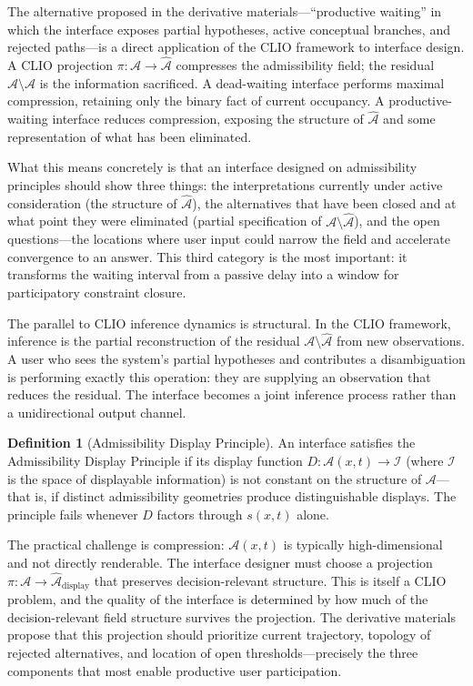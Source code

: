 \documentclass[12pt, a4paper]{article}
\theoremstyle{definition}
\newtheorem{defn}{Definition}[section]
\begin{document}
The alternative proposed in the derivative materials---``productive waiting'' in which the interface exposes partial hypotheses, active conceptual branches, and rejected paths---is a direct application of the CLIO framework to interface design. A CLIO projection $\pi : \mathcal{A} \to \hat{\mathcal{A}}$ compresses the admissibility field; the residual $\mathcal{A} \setminus \hat{\mathcal{A}}$ is the information sacrificed. A dead-waiting interface performs maximal compression, retaining only the binary fact of current occupancy. A productive-waiting interface reduces compression, exposing the structure of $\hat{\mathcal{A}}$ and some representation of what has been eliminated.

What this means concretely is that an interface designed on admissibility principles should show three things: the interpretations currently under active consideration (the structure of $\hat{\mathcal{A}}$), the alternatives that have been closed and at what point they were eliminated (partial specification of $\mathcal{A} \setminus \hat{\mathcal{A}}$), and the open questions---the locations where user input could narrow the field and accelerate convergence to an answer. This third category is the most important: it transforms the waiting interval from a passive delay into a window for participatory constraint closure.

The parallel to CLIO inference dynamics is structural. In the CLIO framework, inference is the partial reconstruction of the residual $\mathcal{A} \setminus \hat{\mathcal{A}}$ from new observations. A user who sees the system's partial hypotheses and contributes a disambiguation is performing exactly this operation: they are supplying an observation that reduces the residual. The interface becomes a joint inference process rather than a unidirectional output channel.

\begin{defn}[Admissibility Display Principle]
An interface satisfies the Admissibility Display Principle if its display function $D : \mathcal{A}(x,t) \to \mathcal{I}$ (where $\mathcal{I}$ is the space of displayable information) is not constant on the structure of $\mathcal{A}$---that is, if distinct admissibility geometries produce distinguishable displays. The principle fails whenever $D$ factors through $s(x,t)$ alone.
\end{defn}

The practical challenge is compression: $\mathcal{A}(x,t)$ is typically high-dimensional and not directly renderable. The interface designer must choose a projection $\pi : \mathcal{A} \to \hat{\mathcal{A}}_{\mathrm{display}}$ that preserves decision-relevant structure. This is itself a CLIO problem, and the quality of the interface is determined by how much of the decision-relevant field structure survives the projection. The derivative materials propose that this projection should prioritize current trajectory, topology of rejected alternatives, and location of open thresholds---precisely the three components that most enable productive user participation.
\end{document}
